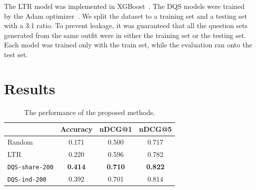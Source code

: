 



The LTR model was implemented in XGBoost~\cite{chen2016xgboost}. 
The DQS models were trained by the Adam optimizer~\cite{kingma2014adam}. 
We split the dataset to a training set and a testing set with a 3:1 ratio. 
To prevent leakage, it was guaranteed that all the question sets generated from the same outfit were in either the training set or the testing set.
Each model was trained only with the train set, 
while the evaluation ran onto the test set.



\section{Results}
\label{sq:results}

\begin{table}[t]
\caption{The performance of the proposed methods.}
\centering
\begin{tabular}{lccc}
\toprule
              & Accuracy             & nDCG@1          & nDCG@5          \\ 
\midrule
Random        & 0.171          & 0.500          & 0.717          \\
LTR    & 0.220          & 0.596          & 0.782 \\
\texttt{DQS-share-200} & \textbf{0.414} & \textbf{0.710} & \textbf{0.822}          \\
\texttt{DQS-ind-200}   & 0.392          & 0.701          & 0.814          \\ 
\bottomrule
\end{tabular}
\label{normal-train-results}
\end{table}

